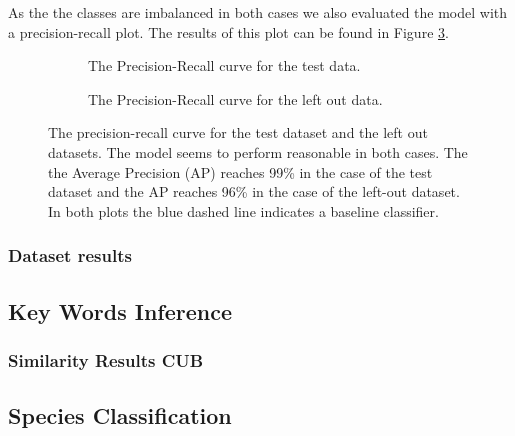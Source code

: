\documentclass[a4paper, 12pt, oneside]{book} %
\begin{document}
As the the classes are imbalanced in both cases we also evaluated the model with a precision-recall plot.
The results of this plot can be found in Figure \ref{fig:precision-recall}.
\begin{figure} [h!]
     \centering
     \begin{subfigure}[b]{0.49\textwidth}
         \centering
         
         \caption{The Precision-Recall curve for the test data.}
         \label{fig:precision_recall_curve_test}
     \end{subfigure}
     \hfill
     \begin{subfigure}[b]{0.49\textwidth}
         \centering
         
         \caption{The Precision-Recall curve for the left out data.}
         \label{fig:precision_recall_curve_test_external}
     \end{subfigure}
     \caption[Precision recall curves for test and left-out datasets]{The precision-recall curve for the test dataset and the left out datasets. The model seems to perform reasonable in both cases. The the Average Precision (AP) reaches 99\% in the case of the test dataset and the AP reaches 96\% in the case of the left-out dataset. In both plots the blue dashed line indicates a baseline classifier.}
     \label{fig:precision-recall}
\end{figure}

\subsubsection{Dataset results}
\subsection{Key Words Inference}
\subsubsection{Similarity Results CUB}
\subsection{Species Classification}
\subsubsection{}
\end{document}
